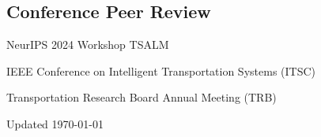 \documentclass[12pt,letterpaper]{report}
\newcommand{\listitemspace}{0.25em}
\renewenvironment{itemize}
{\begin{list}{}{\setlength{\leftmargin}{0em}
                \setlength{\parskip}{0em}
                \setlength{\itemsep}{\listitemspace}
                \setlength{\parsep}{\listitemspace}}}
{\end{list}}
\begin{document}
    \subsection*{Conference Peer Review}
    \begin{itemize}
        \item NeurIPS 2024 Workshop TSALM
        \item IEEE Conference on Intelligent Transportation Systems (ITSC)
        \item Transportation Research Board Annual Meeting (TRB)
    \end{itemize}

    \begin{center}
        \vfill
        Updated \monthyeardate\today
    \end{center}
\end{document}
